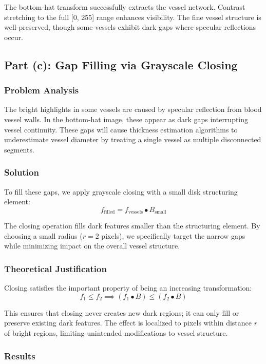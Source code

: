 \documentclass[11pt,a4paper]{article}
\begin{document}
The bottom-hat transform successfully extracts the vessel network. Contrast stretching to the full [0, 255] range enhances visibility. The fine vessel structure is well-preserved, though some vessels exhibit dark gaps where specular reflections occur.

\subsection{Part (c): Gap Filling via Grayscale Closing}

\subsubsection{Problem Analysis}
The bright highlights in some vessels are caused by specular reflection from blood vessel walls. In the bottom-hat image, these appear as dark gaps interrupting vessel continuity. These gaps will cause thickness estimation algorithms to underestimate vessel diameter by treating a single vessel as multiple disconnected segments.

\subsubsection{Solution}
To fill these gaps, we apply grayscale closing with a small disk structuring element:
$$f_{\text{filled}} = f_{\text{vessels}} \bullet B_{\text{small}}$$

The closing operation fills dark features smaller than the structuring element. By choosing a small radius ($r = 2$ pixels), we specifically target the narrow gaps while minimizing impact on the overall vessel structure.

\subsubsection{Theoretical Justification}
Closing satisfies the important property of being an increasing transformation:
$$f_1 \leq f_2 \implies (f_1 \bullet B) \leq (f_2 \bullet B)$$

This ensures that closing never creates new dark regions; it can only fill or preserve existing dark features. The effect is localized to pixels within distance $r$ of bright regions, limiting unintended modifications to vessel structure.

\subsubsection{Results}
\end{document}
